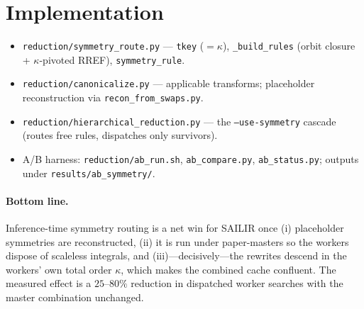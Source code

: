 \documentclass[11pt]{article}
\newcommand{\kk}{\kappa}
\newcommand{\code}[1]{\texttt{#1}}
\begin{document}
\section{Implementation}
\begin{itemize}
\item \code{reduction/symmetry\_route.py} --- \code{tkey} ($=\kk$),
      \code{\_build\_rules} (orbit closure + $\kk$-pivoted RREF), \code{symmetry\_rule}.
\item \code{reduction/canonicalize.py} --- applicable transforms; placeholder
      reconstruction via \code{recon\_from\_swaps.py}.
\item \code{reduction/hierarchical\_reduction.py} --- the \code{--use-symmetry}
      cascade (routes free rules, dispatches only survivors).
\item A/B harness: \code{reduction/ab\_run.sh}, \code{ab\_compare.py},
      \code{ab\_status.py}; outputs under \code{results/ab\_symmetry/}.
\end{itemize}

\paragraph{Bottom line.} Inference-time symmetry routing is a net win for SAILIR once
(i) placeholder symmetries are reconstructed, (ii) it is run under paper-masters so the
workers dispose of scaleless integrals, and (iii)---decisively---the rewrites descend
in the workers' own total order $\kk$, which makes the combined cache confluent. The
measured effect is a $25$--$80\%$ reduction in dispatched worker searches with the
master combination unchanged.
\end{document}
